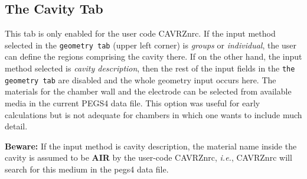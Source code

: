 \documentclass[12pt,twoside]{article}   %
\newcommand{\ie}{{\em i.e.}}
\begin{document}
\newpage
\subsection{The Cavity Tab}

This tab is only enabled for the user code CAVRZnrc. If the input method selected in the
{\tt geometry tab} (upper left corner) is {\em groups} or {\em individual}, the user can
define the regions comprising the cavity there. If on the other hand, the input method selected
is {\em cavity description}, then the rest of the input fields in the {\tt the geometry tab}
are disabled and the whole geometry input occurs here. The materials for the chamber wall
and the electrode can be selected from available media in the current PEGS4 data file.
This option was useful for early calculations but is not adequate for chambers in which one
wants to include much detail.

{\bf Beware:} If the input method is cavity description, the material name inside the cavity is
assumed to be {\bf AIR} by the user-code CAVRZnrc, \ie, CAVRZnrc will search for this medium in
the pegs4 data file. \\ \\
\end{document}
